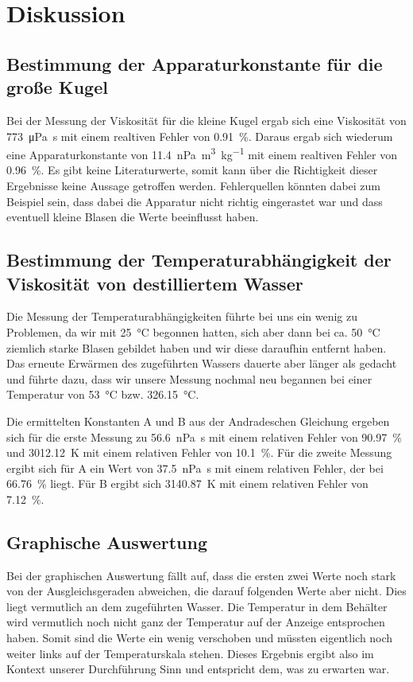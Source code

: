 \section{Diskussion}
\label{sec:Diskussion}

\subsection{Bestimmung der Apparaturkonstante für die große Kugel}
Bei der Messung der Viskosität für die kleine Kugel ergab sich eine Viskosität von \SI{773}{\micro\pascal\second} mit 
einem realtiven Fehler von \SI{0.91}{\percent}.
Daraus ergab sich wiederum eine Apparaturkonstante von \SI{11.4}{\nano\pascal\cubic\meter\per\kilo\gram} mit einem 
realtiven Fehler von \SI{0.96}{\percent}. 
Es gibt keine Literaturwerte, somit kann über die Richtigkeit dieser Ergebnisse keine Aussage getroffen werden. Fehlerquellen könnten dabei zum Beispiel sein, dass dabei die Apparatur nicht richtig eingerastet war und dass eventuell kleine Blasen die Werte beeinflusst haben. 

\subsection{Bestimmung der Temperaturabhängigkeit der Viskosität von destilliertem Wasser}
Die Messung der Temperaturabhängigkeiten führte bei uns ein wenig zu Problemen, da wir mit \SI{25}{\degreeCelsius} 
begonnen hatten, sich aber dann bei ca. \SI{50}{\degreeCelsius} ziemlich starke Blasen gebildet haben und wir diese 
daraufhin entfernt haben. Das erneute Erwärmen des zugeführten Wassers dauerte aber länger als gedacht und führte 
dazu, dass wir unsere Messung nochmal neu begannen bei einer Temperatur von \SI{53}{\degreeCelsius} bzw. 
\SI{326.15}{\degreeCelsius}.

\noindent Die ermittelten Konstanten A und B aus der Andradeschen Gleichung ergeben sich für die erste Messung zu 
\SI{56.6}{\nano\pascal\second} mit einem relativen Fehler von \SI{90.97}{\percent} und \SI{3012.12}{\kelvin} mit 
einem relativen Fehler von \SI{10.1}{\percent}. Für die zweite Messung ergibt sich für A ein Wert von 
\SI{37.5}{\nano\pascal\second} mit einem relativen Fehler, der bei \SI{66.76}{\percent} liegt. Für B ergibt sich 
\SI{3140.87}{\kelvin} mit einem relativen Fehler von \SI{7.12}{\percent}. 

\subsection{Graphische Auswertung}
Bei der graphischen Auswertung fällt auf, dass die ersten zwei Werte noch stark von der Ausgleichsgeraden abweichen, 
die darauf folgenden Werte aber nicht. Dies liegt vermutlich an dem zugeführten Wasser. Die Temperatur in dem 
Behälter wird vermutlich noch nicht ganz der Temperatur auf der Anzeige entsprochen haben. Somit sind die Werte ein 
wenig verschoben und müssten eigentlich noch weiter links auf der Temperaturskala stehen. Dieses Ergebnis ergibt also 
im Kontext unserer Durchführung Sinn und entspricht dem, was zu erwarten war. 

